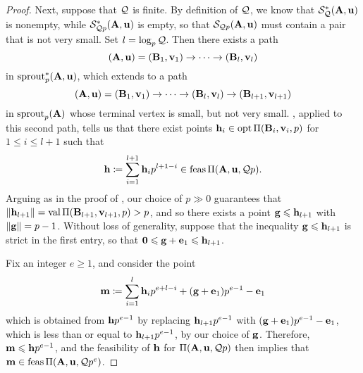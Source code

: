 \documentclass{amsart}
\begin{document}
\begin{proof}
   Next, suppose that $\mathcal{Q}$ is finite.
   By definition of $\mathcal{Q}$, we know that $\mathcal{S}_{\mathcal{Q}}^{\ast}(\mathbf{A},\mathbf{u})$ is nonempty, while $\mathcal{S}^{\ast}_{\mathcal{Q} p}(\mathbf{A},\mathbf{u})$ is empty, so that $\mathcal{S}_{\mathcal{Q} p}(\mathbf{A},\mathbf{u})$ must contain a pair that is not very small.
   Set $l=\log_p \mathcal{Q}$.
   Then there exists a path
   \begin{equation}\label{eq: first path}
      (\mathbf{A},\mathbf{u}) = (\mathbf{B}_1,\mathbf{v}_1) \to \cdots \to (\mathbf{B}_{l}, \mathbf{v}_{l})
   \end{equation}
   in $\operatorname{sprout}_p^{\ast}(\mathbf{A},\mathbf{u})$, which extends to a path
   \[
      (\mathbf{A},\mathbf{u}) = (\mathbf{B}_1,\mathbf{v}_1) \to \cdots \to (\mathbf{B}_{l}, \mathbf{v}_{l}) \to (\mathbf{B}_{l+1}, \mathbf{v}_{l+1})
   \]
   in $\operatorname{sprout}_p(\mathbf{A})$ whose terminal vertex is small, but not very small.
   , applied to this second path, tells us that there exist points $\mathbf{h}_i \in \operatorname{opt} \Pi(\mathbf{B}_i, \mathbf{v}_i, p)$ for $1\le i\le l+1$ such that
   \[
      \mathbf{h} \coloneqq \sum_{i=1}^{l+1} \mathbf{h}_i p^{l+1-i} \in \operatorname{feas} \Pi(\mathbf{A},\mathbf{u}, \mathcal{Q} p).
   \]
   Arguing as in the proof of , our choice of $p \gg 0$ guarantees that $\| \mathbf{h}_{l+1} \| = \operatorname{val}\Pi(\mathbf{B}_{l+1}, \mathbf{v}_{l+1},p) > p$, and so there exists a point $\mathbf{g} \leqslant \mathbf{h}_{l+1}$ with $\| \mathbf{g} \| = p-1$.
   Without loss of generality, suppose that the inequality $\mathbf{g} \leqslant \mathbf{h}_{l+1}$ is strict in the first entry, so that $\mathbf{0} \leqslant \mathbf{g} + \mathbf{e}_1 \leqslant \mathbf{h}_{l+1}$.

   Fix an integer $e \geq 1$, and consider the point
   \[
      \mathbf{m} \coloneqq \sum_{i=1}^{l} \mathbf{h}_i p^{e+l-i} + (\mathbf{g}+\mathbf{e}_1)p^{e-1} - \mathbf{e}_1
   \]
   which is obtained from $\mathbf{h}p^{e-1}$ by replacing $\mathbf{h}_{l+1}p^{e-1}$ with  $(\mathbf{g}+\mathbf{e}_1)p^{e-1} - \mathbf{e}_1$, which is less than or equal to $\mathbf{h}_{l+1} p^{e-1}$, by our choice of $\mathbf{g}$.
   Therefore, $\mathbf{m} \leqslant \mathbf{h}p^{e-1}$, and the feasibility of $\mathbf{h}$ for $\Pi(\mathbf{A},\mathbf{u}, \mathcal{Q} p)$ then implies that $\mathbf{m} \in \operatorname{feas} \Pi(\mathbf{A},\mathbf{u}, \mathcal{Q} p^e)$.


\end{proof}
\end{document}
